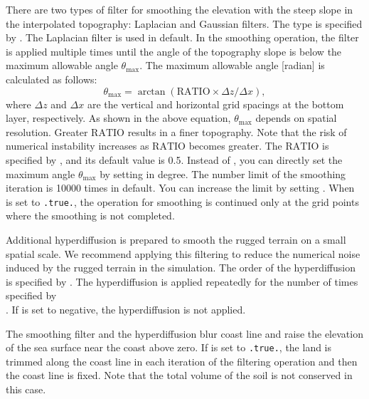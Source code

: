 There are two types of filter for smoothing the elevation with the steep slope in the interpolated topography: Laplacian and Gaussian filters.
The type is specified by . The Laplacian filter is used in default.
In the smoothing operation, the filter is applied multiple times until the angle of the topography slope is below the maximum allowable angle $\theta_{\max}$.
The maximum allowable angle [radian] is calculated as follows:
\begin{equation*}
  \theta_{\max} = \arctan( \mathrm{RATIO} \times \Delta z/\Delta x ),
\end{equation*}
where $\Delta z$ and $\Delta x$ are the vertical and horizontal grid spacings at the bottom layer, respectively.
As shown in the above equation, $\theta_{\max}$ depends on spatial resolution.
Greater $\mathrm{RATIO}$ results in a finer topography.
Note that the risk of numerical instability increases as $\mathrm{RATIO}$ becomes greater.
The $\mathrm{RATIO}$ is specified by , and its default value is 0.5.
Instead of , you can directly set the maximum angle $\theta_{\max}$ by setting  in degree.
The number limit of the smoothing iteration is 10000 times in default.
You can increase the limit by setting .
When  is set to \verb|.true.|, the operation for smoothing is continued only at the grid points where the smoothing is not completed.

Additional hyperdiffusion is prepared to smooth the rugged terrain on a small spatial scale.
We recommend applying this filtering to reduce the numerical noise induced by the rugged terrain in the simulation.
The order of the hyperdiffusion is specified by .
The hyperdiffusion is applied repeatedly for the number of times specified by \\ .
If  is set to negative, the hyperdiffusion is not applied.


The smoothing filter and the hyperdiffusion blur coast line and raise the elevation of the sea surface near the coast above zero.
If  is set to \verb|.true.|, the land is trimmed along the coast line in each iteration of the filtering operation and then the coast line is fixed.
Note that the total volume of the soil is not conserved in this case.



